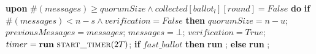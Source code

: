 \documentclass[10pt,pdftex,a4paper]{article}%
\begin{document}
\begin{algorithm}
\begin{algorithmic}[1]
    \State     
    \State \textbf{upon} $\#(messages) \geq quorumSize \land collected[ballot_l][round] = False$ \textbf{do} 
        \State \hspace{\algorithmicindent} \textbf{if }{$\#(messages) < n-s \land verification = False$} \textbf{then}
            \State \hspace{\algorithmicindent}\hspace{\algorithmicindent} $quorumSize = n-u$;
            \State \hspace{\algorithmicindent}\hspace{\algorithmicindent}
            $previousMessages = messages$;
            \State \hspace{\algorithmicindent}\hspace{\algorithmicindent}
            $messages = \bot$;
            \State \hspace{\algorithmicindent}\hspace{\algorithmicindent} $verification = True$;
            \State \hspace{\algorithmicindent}\hspace{\algorithmicindent} $timer = \textbf{run}\ \Call{start\_timer}{2T}$;
            \State \hspace{\algorithmicindent}\hspace{\algorithmicindent} \textbf{if} $fast\_ballot$ \textbf{then}
            \State \hspace{\algorithmicindent}\hspace{\algorithmicindent}\hspace{\algorithmicindent} \textbf{run} ;
            \State\hspace{\algorithmicindent}\hspace{\algorithmicindent} \textbf{else}
            \State\hspace{\algorithmicindent}\hspace{\algorithmicindent}\hspace{\algorithmicindent} \textbf{run} ;
            

\end{algorithmic}
\end{algorithm}
\end{document}
